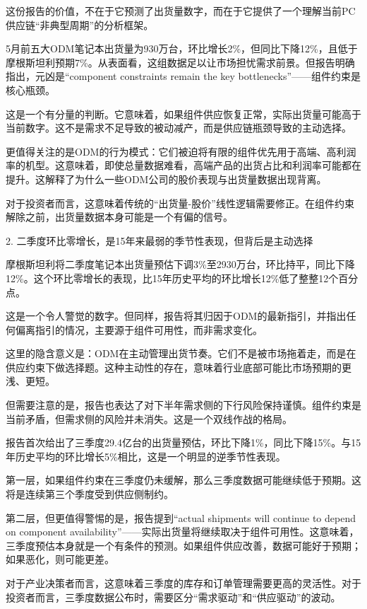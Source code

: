 \documentclass[11pt]{ctexart}
\begin{document}
这份报告的价值，不在于它预测了出货量数字，而在于它提供了一个理解当前PC供应链“非典型周期”的分析框架。

5月前五大ODM笔记本出货量为930万台，环比增长2\%，但同比下降12\%，且低于摩根斯坦利预期7\%。从表面看，这组数据足以让市场担忧需求前景。但报告明确指出，元凶是“component constraints remain the key bottlenecks”——组件约束是核心瓶颈。

这是一个有分量的判断。它意味着，如果组件供应恢复正常，实际出货量可能高于当前数字。这不是需求不足导致的被动减产，而是供应链瓶颈导致的主动选择。

更值得关注的是ODM的行为模式：它们被迫将有限的组件优先用于高端、高利润率的机型。这意味着，即使总量数据难看，高端产品的出货占比和利润率可能都在提升。这解释了为什么一些ODM公司的股价表现与出货量数据出现背离。

对于投资者而言，这意味着传统的“出货量-股价”线性逻辑需要修正。在组件约束解除之前，出货量数据本身可能是一个有偏的信号。

2. 二季度环比零增长，是15年来最弱的季节性表现，但背后是主动选择

摩根斯坦利将二季度笔记本出货量预估下调3\%至2930万台，环比持平，同比下降12\%。这个环比零增长的表现，比15年历史平均的环比增长12\%低了整整12个百分点。

这是一个令人警觉的数字。但同样，报告将其归因于ODM的最新指引，并指出任何偏离指引的情况，主要源于组件可用性，而非需求变化。

这里的隐含意义是：ODM在主动管理出货节奏。它们不是被市场拖着走，而是在供应约束下做选择题。这种主动性的存在，意味着行业底部可能比市场预期的更浅、更短。

但需要注意的是，报告也表达了对下半年需求侧的下行风险保持谨慎。组件约束是当前矛盾，但需求侧的风险并未消失。这是一个双线作战的格局。

报告首次给出了三季度29.4亿台的出货量预估，环比下降1\%，同比下降15\%。与15年历史平均的环比增长5\%相比，这是一个明显的逆季节性表现。

第一层，如果组件约束在三季度仍未缓解，那么三季度数据可能继续低于预期。这将是连续第三个季度受到供应侧制约。

第二层，但更值得警惕的是，报告提到“actual shipments will continue to depend on component availability”——实际出货量将继续取决于组件可用性。这意味着，三季度预估本身就是一个有条件的预测。如果组件供应改善，数据可能好于预期；如果恶化，则可能更差。

对于产业决策者而言，这意味着三季度的库存和订单管理需要更高的灵活性。对于投资者而言，三季度数据公布时，需要区分“需求驱动”和“供应驱动”的波动。
\end{document}
